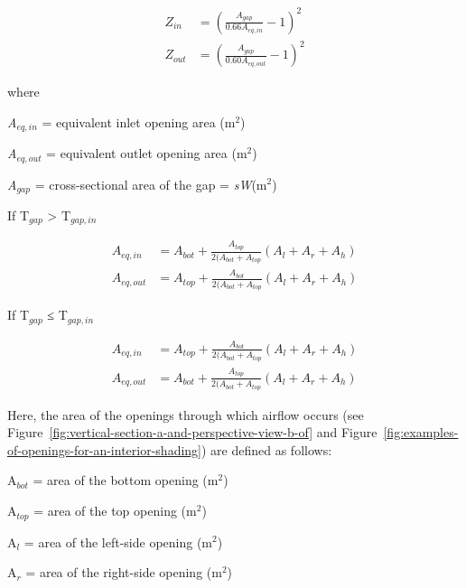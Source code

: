 \begin{equation}
  \begin{array}{rl}
    {Z_{in}}  &= {\left( {\frac{{{A_{gap}}}}{{0.66{A_{eq,in}}}} - 1} \right)^2} \\
    {Z_{out}} &= {\left( {\frac{{{A_{gap}}}}{{0.60{A_{eq,out}}}} - 1} \right)^2}
  \end{array}
\end{equation}

where

\emph{A\(_{eq,in}\)} = equivalent inlet opening area (m\(^{2}\))

\emph{A\(_{eq,out}\)} = equivalent outlet opening area (m\(^{2}\))

\emph{A\(_{gap}\)} = cross-sectional area of the gap = \emph{sW}(m\(^{2}\))

If T\(_{gap}\) \textgreater{} T\(_{gap,in}\)

\begin{equation}
  \begin{array}{rl}
    A_{eq,in}  & = A_{bot} + \frac{A_{top}}{2(A_{bot}+A_{top}} \left( A_l + A_r + A_h \right) \\
    A_{eq,out} & = A_{top} + \frac{A_{bot}}{2(A_{bot}+A_{top}} \left( A_l + A_r + A_h \right) 
  \end{array}
\end{equation}

If T\(_{gap}\) ≤ T\(_{gap,in}\)

\begin{equation}
  \begin{array}{rl}
    A_{eq,in}  & = A_{top} + \frac{A_{bot}}{2(A_{bot}+A_{top}} \left( A_l + A_r + A_h \right) \\
    A_{eq,out} & = A_{bot} + \frac{A_{top}}{2(A_{bot}+A_{top}} \left( A_l + A_r + A_h \right) 
  \end{array}
\end{equation}

Here, the area of the openings through which airflow occurs (see Figure~\ref{fig:vertical-section-a-and-perspective-view-b-of} and Figure~\ref{fig:examples-of-openings-for-an-interior-shading}) are defined as follows:

A\(_{bot}\) = area of the bottom opening (m\(^{2}\))

A\(_{top}\) = area of the top opening (m\(^{2}\))

A\(_{l}\) = area of the left-side opening (m\(^{2}\))

A\(_{r}\) = area of the right-side opening (m\(^{2}\))

